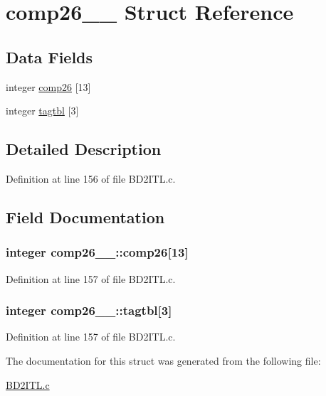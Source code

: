 \hypertarget{structcomp26__1__}{}\section{comp26\+\_\+\_\+ Struct Reference}
\label{structcomp26__1__}
\subsection*{Data Fields}
\begin{DoxyCompactItemize}
\item 
integer \hyperlink{structcomp26__1___a0950a8a4bde46df25a476f0ae8c3442b}{comp26} \mbox{[}13\mbox{]}
\item 
integer \hyperlink{structcomp26__1___aab0ea6c37ec8dd54f9e27f9dbf5eaa39}{tagtbl} \mbox{[}3\mbox{]}
\end{DoxyCompactItemize}


\subsection{Detailed Description}


Definition at line 156 of file B\+D2\+I\+T\+L.\+c.



\subsection{Field Documentation}
\subsubsection[{\texorpdfstring{comp26}{comp26}}]{\setlength{\rightskip}{0pt plus 5cm}integer comp26\+\_\+\_\+\+::comp26\mbox{[}13\mbox{]}}\hypertarget{structcomp26__1___a0950a8a4bde46df25a476f0ae8c3442b}{}\label{structcomp26__1___a0950a8a4bde46df25a476f0ae8c3442b}


Definition at line 157 of file B\+D2\+I\+T\+L.\+c.

\subsubsection[{\texorpdfstring{tagtbl}{tagtbl}}]{\setlength{\rightskip}{0pt plus 5cm}integer comp26\+\_\+\_\+\+::tagtbl\mbox{[}3\mbox{]}}\hypertarget{structcomp26__1___aab0ea6c37ec8dd54f9e27f9dbf5eaa39}{}\label{structcomp26__1___aab0ea6c37ec8dd54f9e27f9dbf5eaa39}


Definition at line 157 of file B\+D2\+I\+T\+L.\+c.



The documentation for this struct was generated from the following file\+:\begin{DoxyCompactItemize}
\item 
\hyperlink{BD2ITL_8c}{B\+D2\+I\+T\+L.\+c}\end{DoxyCompactItemize}
